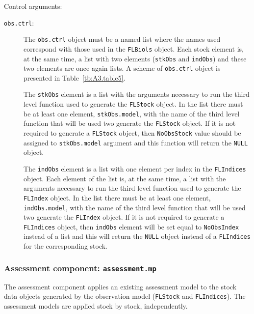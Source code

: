 \noindent Control arguments:
\begin{description}
  \item[\texttt{obs.ctrl}:] %
		The \texttt{obs.ctrl} object must be a named list where the names used correspond with 
		those used in the \texttt{FLBiols} object. Each stock element is, at the same time, a list 
		with two elements (\texttt{stkObs} and \texttt{indObs}) and these two elements are once again lists. 
		A scheme of \texttt{obs.ctrl} object is presented in Table~\ref{tb:A3.table5}.

  	The \texttt{stkObs} element is a list with the arguments necessary to run the 
		third level function used to generate the \texttt{FLStock} object. In the list there must be 
		at least one element, \texttt{stkObs.model}, with the name of the third level function 
		that will be used two generate the \texttt{FLStock} object. If it is not required to generate a \texttt{FLStock} 
		object, then \texttt{NoObsStock} value should be assigned to \texttt{stkObs.model} argument and 
		this function will return the \texttt{NULL} object.

		The \texttt{indObs} element is a list with one element per index in the \texttt{FLIndices} object.
		Each element of the list is, at the same time, a list with the arguments necessary to run the 
		third level function used to generate the \texttt{FLIndex} object. In the list there must be 
		at least one element, \texttt{indObs.model}, with the name of the third level function 
		that will be used two generate the \texttt{FLIndex} object. If it is not required to generate a \texttt{FLIndices} 
		object, then \texttt{indObs} element will be set equal to \texttt{NoObsIndex} instead of a list and this will return 
		the \texttt{NULL} object instead of a \texttt{FLIndices} for the corresponding stock.

\end{description}


	\subsubsection{Assessment component: \texttt{assessment.mp}}
	
	The assessment component applies an existing assessment model to the stock data objects generated by the observation model 
	(\texttt{FLStock} and \texttt{FLIndices}). The assessment models are applied stock by stock, independently.
	
